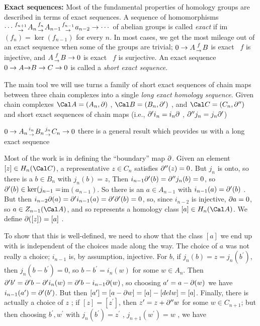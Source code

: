 \msk

{\bf Exact sequences:} Most of the fundamental properties of homology groups
are described in terms of exact sequences. A sequence of homomorphisms
\hhsk $\cdots {f_{n+1}\atop\rightarrow} A_n {f_n\atop\rightarrow} A_{n-1} {f_{n-1}\atop\rightarrow} a_{n-2} 
\rightarrow \cdots$ \hhsk
of abelian groups is called {\it exact} if im$(f_n)=\ker(f_{n-1})$ 
for every $n$. In most cases,
we get the most mileage out of an exact sequence when some of the groups
are trivial; $0\rightarrow A {f\atop\rightarrow}B$ is exact \lra\ $f$ is injective, and 
$A {f\atop\rightarrow}B\rightarrow 0$ is exact \lra\ $f$ is surjective. 
An exact sequence $0\rightarrow A {\rightarrow}B\rightarrow C\rightarrow 0$ is called a {\it short exact sequence}.

\bsk

The main tool we will use turns a family of short exact sequences of chain maps
between three chain complexes into a single {\it long exact homology sequence}.
Given chain complexes ${\Cal A}=(A_n,\del)$ , 
${\Cal B}=(B_n,\del^\prime)$ , and ${\Cal C}=(C_n,\del^{\prime\prime})$
and short exact sequences of chain maps (i.e., 
$\partial^\prime i_n  = i_n\partial $ , $\partial^{\prime\prime}j_n = j_n\partial^\prime $)
\hhsk

$0\rightarrow A_n{i_n\atop \rightarrow}B_n{j_n\atop \rightarrow}C_n\rightarrow 0$
\hhsk
there is a general result which provides us with a long exact sequence


Most of the work is in defining the ``boundary'' map $\partial$. Given an 
element $[z]\in H_n({\Cal C})$, a representative $z\in C_n$ satisfies 
$\partial^{\prime\prime}(z)=0$. But $j_n$ is onto, so there is a $b\in B_n$ with
$j_n(b)=z$, Then $ i_{n-1}\partial^\prime(b) = \partial^{\prime\prime}j_n(b)
=0$, so $\partial^\prime(b)\in\ker(j_{n-1}=$im$(a_{n-1})$. So there is an $a\in A_{n-1}$
with $i_{n-1}(a)=\partial^\prime(b)$ . But then 
$i_{n-2}\partial (a) = \partial^\prime i_{n-1}(a)=\partial^\prime\partial^\prime(b)=0$,
so, since $i_{n-2}$ is injective, $\partial a=0$, so $a\in Z_{n-1}({\Cal A})$, and
so represents a homology class $[a]\in H_n({\Cal A})$. We define
$\partial([z])=[a]$ . 


To show that this is well-defined, we need to show that the
class $[a]$ we end up with is independent of the choices made along the 
way. The choice of $a$ was not really a choice; $i_{n-1}$ is, by assumption, 
injective. For $b$, if $j_n(b)=z=j_n(b^\prime)$, then
$j_n(b-b^\prime)=0$, so $b-b^\prime=i_n(w)$ for some $w\in A_n$. Then 
$\partial^\prime b^\prime = \partial^\prime b - \partial^\prime i_n(w) = 
\partial^\prime b - i_{n-1} \partial(w)$, so choosing $a^\prime = a-\partial(w)$ we have
$i_{n-1}(a^\prime)=\partial^\prime(b^\prime)$. But then
$[a^\prime]=[a-\partial w] =[a] -[del w] =[a]$. Finally, there is actually a choice
of $z$ ; if $[z]=[z^\prime]$, then $z^\prime = z+\partial^{\prime\prime}w$
for some $w\in C_{n+1}$; but then choosing $b^\prime,w^\prime$ with 
$j_n(b^\prime)=z^\prime$ , $j_{n+1}(w^\prime)=w$ , we have 

